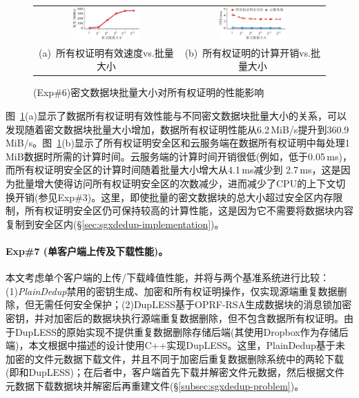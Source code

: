 \begin{figure}[!htb]
  \centering
  \begin{tabular}{@{\ }c@{\ }c}
    \includegraphics[width=0.49\textwidth]{pic/sgxdedup/plot/exp_a4/expa4_powBatchSize_overall.pdf} & 
    \includegraphics[width=0.49\textwidth]{pic/sgxdedup/plot/exp_a4/expa4_powBatchSize_breakdown.pdf}  \\
    \mbox{\small (a) 所有权证明有效速度vs.批量大小}                                                 & 
    \mbox{\small (b) 所有权证明的计算开销vs.批量大小}
  \end{tabular}
  \caption{(Exp\#6)密文数据块批量大小对所有权证明的性能影响}
  \label{fig:sgxdedup-exp-pow-impact}
\end{figure}

图~\ref{fig:sgxdedup-exp-pow-impact}(a)显示了数据所有权证明有效性能与不同密文数据块批量大小的关系，可以发现随着密文数据块批量大小增加，数据所有权证明性能从6.2\,MiB/s提升到360.9\,MiB/s。图~\ref{fig:sgxdedup-exp-pow-impact}(b)显示了所有权证明安全区和云服务端在数据所有权证明中每处理1\,MiB数据时所需的计算时间。云服务端的计算时间开销很低(例如，低于0.05\,ms)，而所有权证明安全区的计算时间随着批量大小增大从4.1\,ms减少到 2.7\,ms，这是因为批量增大使得访问所有权证明安全区的次数减少，进而减少了CPU的上下文切换开销(参见Exp\#3)。这里，即使批量的密文数据块的总大小超过安全区内存限制，所有权证明安全区仍可保持较高的计算性能，这是因为它不需要将数据块内容复制到安全区内(\S\ref{sec:sgxdedup-implementation})。


\paragraph*{Exp\#7 (单客户端上传及下载性能)。}本文考虑单个客户端的上传/下载峰值性能，并将\sysnameS 与两个基准系统进行比较：(1)\textit{PlainDedup}禁用\sysnameS 的密钥生成、加密和所有权证明操作，仅实现源端重复数据删除，但无需任何安全保护；(2)DupLESS基于OPRF-RSA生成数据块的消息锁加密密钥，并对加密后的数据块执行源端重复数据删除，但不包含数据所有权证明。由于DupLESS的原始实现不提供重复数据删除存储后端(其使用Dropbox作为存储后端)，本文根据中描述的设计使用C++实现DupLESS。这里，PlainDedup基于未加密的文件元数据下载文件，并且不同于加密后重复数据删除系统中的两轮下载(即\sysnameS 和DupLESS)；在后者中，客户端首先下载并解密文件元数据，然后根据文件元数据下载数据块并解密后再重建文件(\S\ref{subsec:sgxdedup-problem})。

